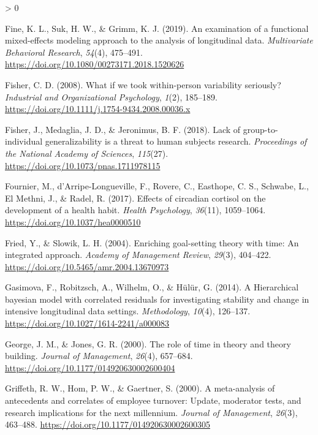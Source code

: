 \documentclass[
12pt, %
twoside,
english]{guelphthesis}
\newlength{\cslhangindent}
\newenvironment{CSLReferences}[2] %
 {%
  \setlength{\parindent}{0pt}
  \ifodd #1 \everypar{\setlength{\hangindent}{\cslhangindent}}\ignorespaces\fi
  \ifnum #2 > 0
  \setlength{\parskip}{\linespacing{2}}
  \fi
 }%
 {}
\begin{document}
\begin{CSLReferences}{1}{0}
\leavevmode{}%
Fine, K. L., Suk, H. W., \& Grimm, K. J. (2019). An examination of a functional mixed-effects modeling approach to the analysis of longitudinal data. \emph{Multivariate Behavioral Research}, \emph{54}(4), 475--491. \url{https://doi.org/10.1080/00273171.2018.1520626}

\leavevmode{}%
Fisher, C. D. (2008). What if we took within-person variability seriously? \emph{Industrial and Organizational Psychology}, \emph{1}(2), 185--189. \url{https://doi.org/10.1111/j.1754-9434.2008.00036.x}

\leavevmode{}%
Fisher, J., Medaglia, J. D., \& Jeronimus, B. F. (2018). Lack of group-to-individual generalizability is a threat to human subjects research. \emph{Proceedings of the National Academy of Sciences}, \emph{115}(27). \url{https://doi.org/10.1073/pnas.1711978115}

\leavevmode{}%
Fournier, M., d'Arripe-Longueville, F., Rovere, C., Easthope, C. S., Schwabe, L., El Methni, J., \& Radel, R. (2017). Effects of circadian cortisol on the development of a health habit. \emph{Health Psychology}, \emph{36}(11), 1059--1064. \url{https://doi.org/10.1037/hea0000510}

\leavevmode{}%
Fried, Y., \& Slowik, L. H. (2004). Enriching goal-setting theory with time: An integrated approach. \emph{Academy of Management Review}, \emph{29}(3), 404--422. \url{https://doi.org/10.5465/amr.2004.13670973}

\leavevmode{}%
Gasimova, F., Robitzsch, A., Wilhelm, O., \& Hülür, G. (2014). A Hierarchical bayesian model with correlated residuals for investigating stability and change in intensive longitudinal data settings. \emph{Methodology}, \emph{10}(4), 126--137. \url{https://doi.org/10.1027/1614-2241/a000083}

\leavevmode{}%
George, J. M., \& Jones, G. R. (2000). The role of time in theory and theory building. \emph{Journal of Management}, \emph{26}(4), 657--684. \url{https://doi.org/10.1177/014920630002600404}

\leavevmode{}%
Griffeth, R. W., Hom, P. W., \& Gaertner, S. (2000). A meta-analysis of antecedents and correlates of employee turnover: Update, moderator tests, and research implications for the next millennium. \emph{Journal of Management}, \emph{26}(3), 463--488. \url{https://doi.org/10.1177/014920630002600305}


\end{CSLReferences}
\end{document}
